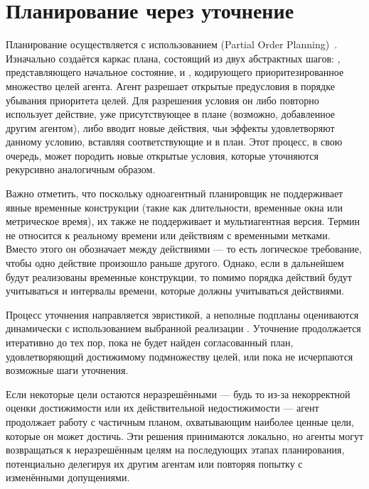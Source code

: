 \section{Планирование через уточнение}

Планирование осуществляется с использованием
(Partial Order Planning)~\cite{Weld_1994,BENTON2009562}.
Изначально создаётся каркас плана, состоящий из двух абстрактных шагов:
, представляющего начальное состояние,
и , кодирующего приоритезированное множество целей агента.
Агент разрешает открытые предусловия  в порядке убывания приоритета целей.
Для разрешения условия он либо повторно использует действие,
уже присутствующее в плане (возможно, добавленное другим агентом),
либо вводит новые действия, чьи эффекты удовлетворяют данному условию,
вставляя соответствующие  и  в план.
Этот процесс, в свою очередь, может породить новые открытые условия,
которые уточняются рекурсивно аналогичным образом.

Важно отметить, что поскольку
одноагентный планировщик не поддерживает явные временные конструкции
(такие как длительности, временные окна или метрическое время),
их также не поддерживает и мультиагентная версия.
Термин 
не относится к реальному времени или действиям с временными метками.
Вместо этого он обозначает  между действиями ---
то есть логическое требование, чтобы одно действие произошло раньше другого.
Однако, если в дальнейшем будут реализованы временные конструкции,
то помимо порядка действий будут учитываться и интервалы времени,
которые должны учитываться действиями.

Процесс уточнения направляется эвристикой,
а неполные подпланы оцениваются динамически
с использованием выбранной реализации .
Уточнение продолжается итеративно до тех пор,
пока не будет найден согласованный план,
удовлетворяющий достижимому подмножеству целей,
или пока не исчерпаются возможные шаги уточнения.

Если некоторые цели остаются неразрешёнными
--- будь то из-за некорректной оценки достижимости или их действительной недостижимости ---
агент продолжает работу с частичным планом,
охватывающим наиболее ценные цели, которые он может достичь.
Эти решения принимаются локально,
но агенты могут возвращаться к неразрешённым целям на последующих этапах планирования,
потенциально делегируя их другим агентам или повторяя попытку с изменёнными допущениями.

